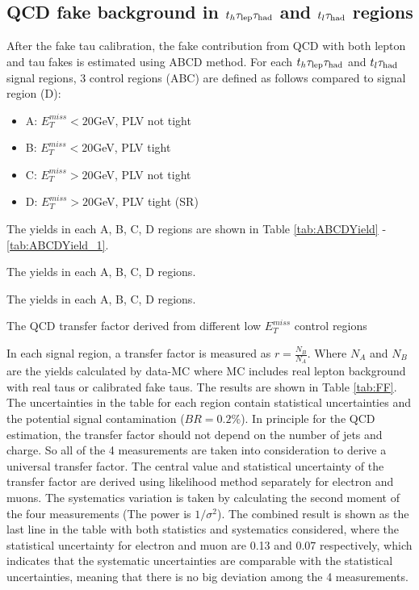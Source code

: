 \subsection{QCD fake background in $t_h\tau_\text{lep}{}\tau_\text{had}$ and $t_l\tau_\text{had}$ regions}
\label{sec:ABCD}
After the fake tau calibration, the fake contribution from QCD with both lepton and tau fakes is estimated using ABCD method. For each $t_h\tau_\text{lep}{}\tau_\text{had}$ and $t_l\tau_\text{had}$ signal regions, 3 control regions (ABC) are defined as follows compared to signal region (D):

\begin{itemize}
	\item A: $E_T^{miss}<20$GeV, PLV not tight
	\item B: $E_T^{miss}<20$GeV, PLV tight
	\item C: $E_T^{miss}>20$GeV, PLV not tight
	\item D: $E_T^{miss}>20$GeV, PLV tight (SR)
\end{itemize}

The yields in each A, B, C, D regions are shown in Table \ref{tab:ABCDYield} - \ref{tab:ABCDYield_1}.

\begin{table}
\caption{The yields in each A, B, C, D regions.}
\label{tab:ABCDYield}

\end{table}

\begin{table}
\caption{The yields in each A, B, C, D regions.}
\label{tab:ABCDYield_1}

\end{table}

\begin{table}
\caption{The QCD transfer factor derived from different low $E_T^{miss}$ control regions}
\label{tab:FF}

\end{table}

In each signal region, a transfer factor is measured as $r=\frac{N_B}{N_A}$. Where $N_A$ and $N_B$ are the yields calculated by data-MC where MC includes real lepton background with real taus or calibrated fake taus. The results are shown in Table \ref{tab:FF}. The uncertainties in the table for each region contain statistical uncertainties and the potential signal contamination ($BR=0.2\%$). In principle for the QCD estimation, the transfer factor should not depend on the number of jets and charge. So all of the 4 measurements are taken into consideration to derive a universal transfer factor. The central value and statistical uncertainty of the transfer factor are derived using likelihood method separately for electron and muons. The systematics variation is taken by calculating the second moment of the four measurements (The power is $1/\sigma^2$). The combined result is shown as the last line in the table with both statistics and systematics considered, where the statistical uncertainty for electron and muon are 0.13 and 0.07 respectively, which indicates that the systematic uncertainties are comparable with the statistical uncertainties, meaning that there is no big deviation among the 4 measurements.


